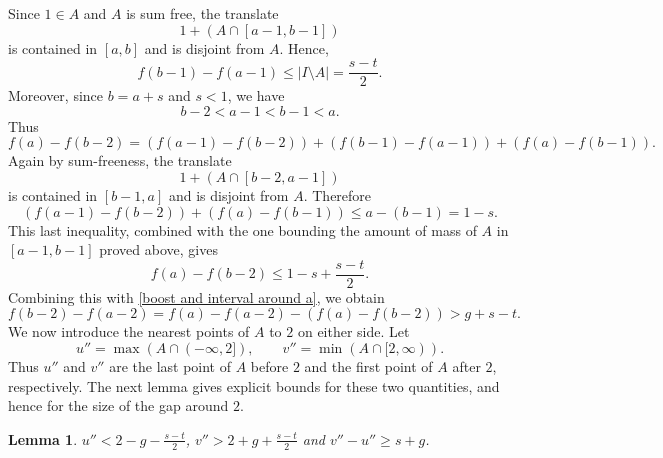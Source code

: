 \documentclass[11pt,reqno]{amsart}
\newtheorem{lem}[thm]{Lemma}
\theoremstyle{definition}
\def\F#1{f(#1)}
\begin{document}
Since $1\in A$ and $A$ is sum free, the translate
$$
    1+(A\cap[a-1,b-1])
$$
is contained in $[a,b]$ and is disjoint from $A$. Hence,  
$$
    \F{b-1}-\F{a-1}\leq |I\setminus A|=\frac{s-t}{2}.
$$
Moreover, since $b=a+s$ and $s<1$, we have
$$
    b-2<a-1<b-1<a.
$$
Thus
$$
    \F{a}-\F{b-2}
    =
    (\F{a-1}-\F{b-2})
    +(\F{b-1}-\F{a-1})
    +(\F{a}-\F{b-1}).
$$
Again by sum-freeness, the translate
$$
    1+(A\cap[b-2,a-1])
$$
is contained in $[b-1,a]$ and is disjoint from $A$. Therefore
$$
    (\F{a-1}-\F{b-2})+(\F{a}-\F{b-1})
    \leq a-(b-1)=1-s.
$$
This last inequality, combined with the one bounding the amount of mass of $A$ in $[a-1,b-1]$ proved above, gives
$$
    \F{a}-\F{b-2}
    \leq
    1-s+\frac{s-t}{2}.
$$
Combining this with \eqref{boost and interval around a}, we obtain
$$
    \F{b-2}-\F{a-2}
    =
    \F{a}-\F{a-2}-(\F{a}-\F{b-2})
    >
    g+s-t.
$$
We now introduce the nearest points of $A$ to $2$ on either side. Let
$$
u''=\max(A\cap(-\infty,2]),\qquad v''=\min(A\cap[2,\infty)).
$$
Thus $u''$ and $v''$ are the last point of $A$ before $2$ and the first point of $A$ after $2$, respectively. The next lemma gives explicit bounds for these two quantities, and hence for the size of the gap around $2$.
\begin{lem}
    $u'' < 2 - g - \frac{s - t}{2}$, $v'' > 2 + g + \frac{s - t}{2}$ and $v'' - u''\geq s + g$. 
\end{lem}
\end{document}
